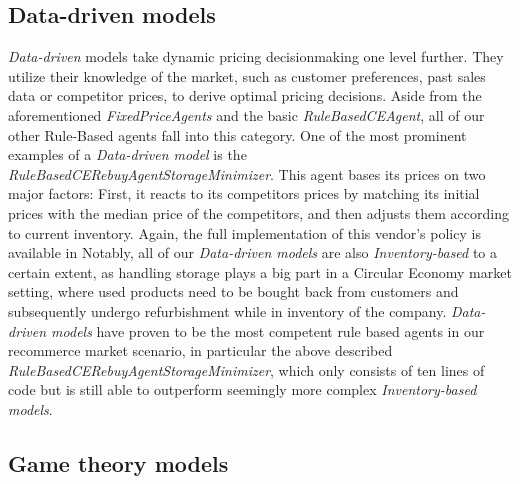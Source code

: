 \subsection*{Data-driven models}

\emph{Data-driven} models take dynamic pricing decisionmaking one level further. They utilize their knowledge of the market, such as customer preferences, past sales data or competitor prices, to derive optimal pricing decisions. Aside from the aforementioned \emph{FixedPriceAgents} and the basic \emph{RuleBasedCEAgent}, all of our other Rule-Based agents fall into this category. One of the most prominent examples of a \emph{Data-driven model} is the \emph{RuleBasedCERebuyAgentStorageMinimizer}. This agent bases its prices on two major factors: First, it reacts to its competitors prices by matching its initial prices with the median price of the competitors, and then adjusts them according to current inventory. Again, the full implementation of this vendor's policy is available in  Notably, all of our \emph{Data-driven models} are also \emph{Inventory-based} to a certain extent, as handling storage plays a big part in a Circular Economy market setting, where used products need to be bought back from customers and subsequently undergo refurbishment while in inventory of the company. \emph{Data-driven models} have proven to be the most competent rule based agents in our recommerce market scenario, in particular the above described \emph{RuleBasedCERebuyAgentStorageMinimizer}, which only consists of ten lines of code but is still able to outperform seemingly more complex \emph{Inventory-based models}.

\subsection*{Game theory models}\label{subsec:GameTheory}

